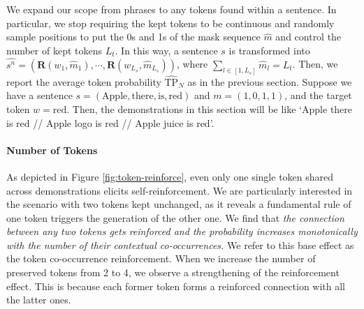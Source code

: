 \documentclass{article} %
\def\elliott#1{{\color{cyan}{\bf [Elliott:} {{#1}}{\bf ]}}}
\begin{document}
We expand our scope from phrases to any tokens found within a sentence. 
In particular, we stop requiring the kept tokens to be continuous and randomly sample positions to put the 0s and 1s of the mask sequence $\hat{m}$ and control the number of kept tokens $L_t$. 
In this way, a sentence $s$ is transformed into $\hat{s^n}=(\mathbf{R}(w_1, \hat{m}_1), \cdots, \mathbf{R}(w_{L_s}, \hat{m}_{L_s}))$, where $\sum_{l\in[1,L_s]} \hat{m}_l = L_t$.
Then, we report the average token probability $\hat{\text{TP}}_N$ as in the previous section. 
Suppose we have a sentence $s=(\text{Apple}, \text{there}, \text{is}, \text{red})$ and $m=(1, 0, 1, 1)$, and the target token $w=\text{red}$. 
Then, the demonstrations in this section will be like `{\color{red}Apple} there {\color{red}is red} // {\color{red}Apple} logo {\color{red}is red} // {\color{red}Apple} juice {\color{red}is red}'. 



\paragraph{Number of Tokens} As depicted in Figure \ref{fig:token-reinforce}, even only one single token shared across demonstrations elicits self-reinforcement. 
We are particularly interested in the scenario with two tokens kept unchanged, as it reveals a fundamental rule of one token triggers the generation of the other one. 
We find that \emph{the connection between any two tokens gets reinforced and the probability increases monotonically with the number of their contextual co-occurrences.}
We refer to this base effect as the token co-occurrence reinforcement. 
When we increase the number of preserved tokens from 2 to 4, we observe a strengthening of the reinforcement effect. 
This is because each former token forms a reinforced connection with all the latter ones. 
\end{document}
